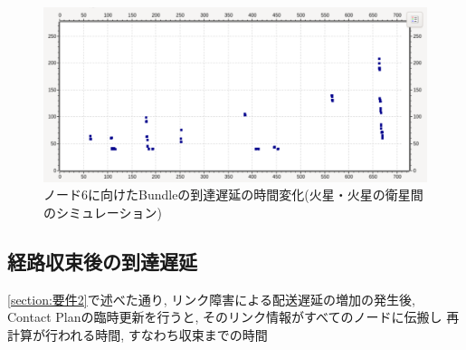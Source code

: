 \begin{figure}[tbh]
    \centering
    \includegraphics[width=0.7\textheight]{img/thesis_sample_delay_time.pdf}
    \caption{ノード6に向けたBundleの到達遅延の時間変化(火星・火星の衛星間のシミュレーション)}
    \label{fig:delay_time_variation_mars_marssat}
    \begin{minipage}{\textwidth}
        \raggedright
    \end{minipage}
\end{figure}

\subsection{経路収束後の到達遅延}
\label{section:経路収束後の到達遅延}
\ref{section:要件2}で述べた通り, リンク障害による配送遅延の増加の発生後, 
Contact Planの臨時更新を行うと, そのリンク情報がすべてのノードに伝搬し
再計算が行われる時間, すなわち収束までの時間

